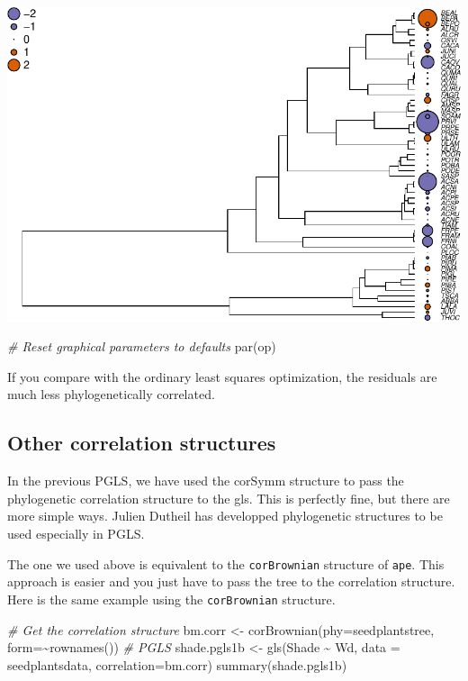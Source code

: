 \documentclass[
]{book}
\newenvironment{Shaded}{\begin{snugshade}}{\end{snugshade}}
\newcommand{\AttributeTok}[1]{\textcolor[rgb]{0.77,0.63,0.00}{#1}}
\newcommand{\CommentTok}[1]{\textcolor[rgb]{0.56,0.35,0.01}{\textit{#1}}}
\newcommand{\FunctionTok}[1]{\textcolor[rgb]{0.00,0.00,0.00}{#1}}
\newcommand{\NormalTok}[1]{#1}
\newcommand{\OtherTok}[1]{\textcolor[rgb]{0.56,0.35,0.01}{#1}}
\newcommand{\SpecialCharTok}[1]{\textcolor[rgb]{0.00,0.00,0.00}{#1}}
\begin{document}
\includegraphics{pcm-workshop_files/figure-latex/pgls residual fit-1.pdf}

\begin{Shaded}
\begin{Highlighting}[]
\CommentTok{\# Reset graphical parameters to defaults}
\FunctionTok{par}\NormalTok{(op) }
\end{Highlighting}
\end{Shaded}

If you compare with the ordinary least squares optimization, the residuals are much less phylogenetically correlated.

\hypertarget{other-correlation-structures}{%
\subsection{Other correlation structures}\label{other-correlation-structures}}

In the previous PGLS, we have used the corSymm structure to pass the phylogenetic correlation structure to the gls. This is perfectly fine, but there are more simple ways. Julien Dutheil has developped phylogenetic structures to be used especially in PGLS.

The one we used above is equivalent to the \texttt{corBrownian} structure of \texttt{ape}. This approach is easier and you just have to pass the tree to the correlation structure. Here is the same example using the \texttt{corBrownian} structure.

\begin{Shaded}
\begin{Highlighting}[]
\CommentTok{\# Get the correlation structure}
\NormalTok{bm.corr }\OtherTok{\textless{}{-}} \FunctionTok{corBrownian}\NormalTok{(}\AttributeTok{phy=}\NormalTok{seedplantstree, }\AttributeTok{form=}\SpecialCharTok{\textasciitilde{}}\FunctionTok{rownames}\NormalTok{())}
\CommentTok{\# PGLS}
\NormalTok{shade.pgls1b }\OtherTok{\textless{}{-}} \FunctionTok{gls}\NormalTok{(Shade }\SpecialCharTok{\textasciitilde{}}\NormalTok{ Wd, }\AttributeTok{data =}\NormalTok{ seedplantsdata, }\AttributeTok{correlation=}\NormalTok{bm.corr)}
\FunctionTok{summary}\NormalTok{(shade.pgls1b)}
\end{Highlighting}
\end{Shaded}
\end{document}
